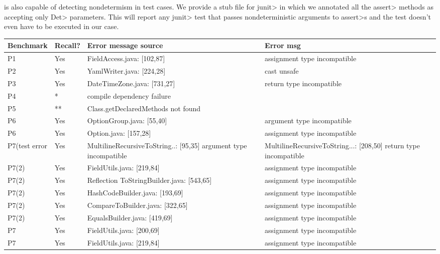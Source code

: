 \TheDeterminismChecker is also capable of detecting nondetermism in test cases. We provide a stub file
for \<junit> in which we annotated all the \<assert> methods as accepting only \<Det> parameters.
This will report any \<junit> test that passes nondeterministic arguments to \<assert>s and the test doesn't
even have to be executed in our case.

\begin{table}[]
    \begin{tabular}{|p{1.5cm}|p{1cm}|p{5cm}|p{5cm}|}
        \hline
        Benchmark & Recall? & Error message source & Error msg  \\ \hline
        P1 & Yes & FieldAccess.java: [102,87] & assignment type incompatible \\
        P2 & Yes & YamlWriter.java: [224,28] & cast unsafe  \\
        P3 & Yes & DateTimeZone.java: [731,27] &  return type incompatible \\ 
        P4 & * & compile dependency failure  &   \\ 
        P5 & ** & Class.getDeclaredMethods not found &    \\ 
        P6 & Yes & OptionGroup.java: [55,40]  & argument type incompatible \\ 
        P6 & Yes & Option.java: [157,28]  &  assignment type incompatible\\
        P7(test error & Yes & MultilineRecursiveToString..: [95,35] argument type incompatible & MultilineRecursiveToString...: [208,50]  return type incompatible \\ 
        P7(2) & Yes & FieldUtils.java: [219,84] & assignment type incompatible \\
        P7(2) & Yes & Reflection ToStringBuilder.java: [543,65]  & assignment type incompatible  \\
        P7(2) & Yes & HashCodeBuilder.java: [193,69]  & assignment type incompatible   \\
        P7(2) & Yes & CompareToBuilder.java: [322,65] & assignment type incompatible   \\
        P7(2) & Yes & EqualsBuilder.java: [419,69]  & assignment type incompatible  \\
        P7 & Yes & FieldUtils.java: [200,69] & assignment type incompatible \\
        P7 & Yes & FieldUtils.java: [219,84] & assignment type incompatible  \\

\end{tabular}
\end{table}
